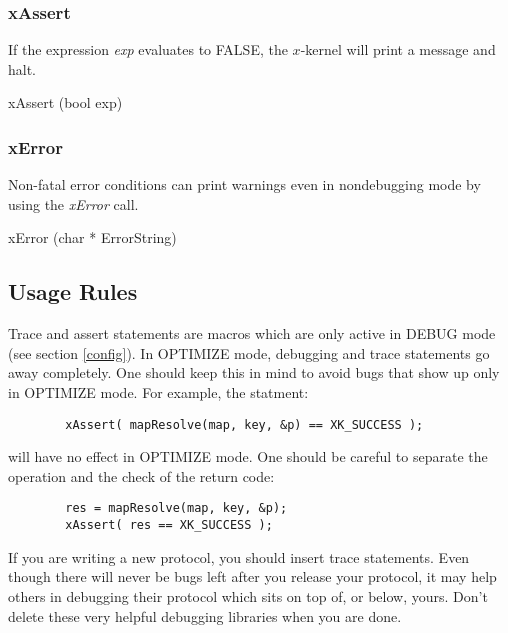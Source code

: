 \subsubsection{xAssert}

If the expression {\em exp} evaluates to FALSE, the $x$-kernel will
print a message and halt.
\medskip

{\bold xAssert} ({\sem bool} {\caps exp})

\subsubsection{xError}

Non-fatal error conditions can print warnings even in nondebugging
mode by using the {\em xError} call.
\medskip

{\bold xError} ({\sem char *} {\caps ErrorString})

\subsection{Usage Rules}

Trace and assert statements are macros which are only active in DEBUG
mode (see section \ref{config}).  In OPTIMIZE mode, debugging and
trace statements go away completely.  One should keep this in mind to
avoid bugs that show up only in OPTIMIZE mode.  For example, the
statment:

\begin{verbatim}
        xAssert( mapResolve(map, key, &p) == XK_SUCCESS );
\end{verbatim}

\noindent
will have no effect in OPTIMIZE mode.  One should be careful to
separate the operation and the check of the return code:

\begin{verbatim}
        res = mapResolve(map, key, &p);
        xAssert( res == XK_SUCCESS );
\end{verbatim}


If you are writing a new protocol, you should insert trace
statements. Even though there will never be bugs left after you
release your protocol, it may help others in debugging their protocol
which sits on top of, or below, yours. Don't delete these very helpful
debugging libraries when you are done.
